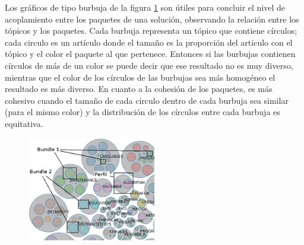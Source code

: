 Los gráficos de tipo burbuja de la figura \ref{res:img-explain-bubbles} son útiles para concluir el nivel de acoplamiento entre los paquetes de una solución, observando la relación entre los tópicos y los paquetes. Cada burbuja representa un tópico que contiene círculos; cada circulo es un artículo donde el tamaño es la proporción del articulo con el tópico y el color el paquete al que pertenece. Entonces si las burbujas contienen círculos de más de un color se puede decir que ese resultado no es muy diverso, mientras que el color de los círculos de las burbujas sea más homogéneo el resultado es más diverso. En cuanto a la cohesión de los paquetes, es más cohesivo cuando el tamaño de cada circulo dentro de cada burbuja sea similar (para el mismo color) y la distribución de los círculos entre cada burbuja es equitativa.

\begin{figure}[H]
  \centering
    \includegraphics[width=0.5\textwidth]{img/explain-bubbles.png}
  \caption{}
  \label{res:img-explain-bubbles}
\end{figure}


